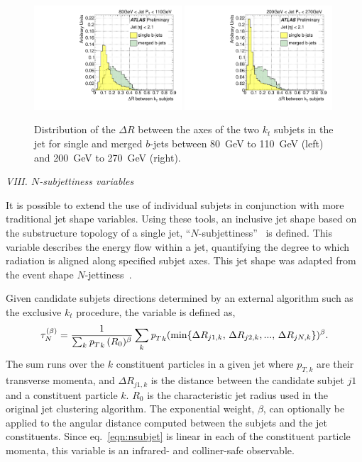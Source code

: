 \begin{figure}[tp]
\centering
\includegraphics[width=0.49\textwidth]{FIGS/VarsSingleMerged/DRkt2axes080.pdf}
\includegraphics[width=0.49\textwidth]{FIGS/VarsSingleMerged/DRkt2axes200.pdf}
\caption{Distribution of the $\Delta R$ between the axes of the two $k_t$ subjets in the jet for single and merged $b$-jets between 80~GeV to 110~GeV (left) and 200~GeV to 270~GeV (right).}
\label{fig:drktsinglemerged}
\end{figure}


{ \em VIII. $N$-subjettiness variables}
\vspace{3 mm}

It is possible to extend the use of individual subjets in conjunction with more traditional jet shape variables. Using these tools, an inclusive jet shape based on the substructure topology of a single jet, ``$N$-subjettiness''~\cite{nsubjettiness} is defined. This variable describes the energy flow within a jet, quantifying the degree to which radiation is aligned along specified subjet axes. This jet shape was adapted from the event shape $N$-jettiness~\cite{njetti}.

Given candidate subjets directions determined by an external algorithm such as the exclusive $k_t$ procedure, the variable is defined as,
%
\begin{equation} 
\tau^{(\beta)}_N = \frac{1}{\sum_k {{\emph{p}_{T}}}_k\,(R_0)^{\beta}} \sum_k {{\emph{p}_{T}}}_k (\min \{ \Delta R_{j1,k},\,\Delta R_{j2,k},...,\,\Delta R_{jN,k} \})^{\beta}.
\label{eqn:nsubjet}
\end{equation} 
%
The sum runs over the $k$ constituent particles in a given jet where $p_{T,k}$ are their transverse momenta, and $\Delta R_{j1,k}$ is the distance between the candidate subjet $j1$ and a constituent particle $k$.  $R_0$ is the characteristic jet radius used in the original jet clustering algorithm.  The exponential weight, $\beta$, can optionally be applied to the angular distance computed between the subjets and the jet constituents.   
Since eq.~\ref{eqn:nsubjet} is linear in each of the constituent particle momenta, this variable is an infrared- and colliner-safe observable.


